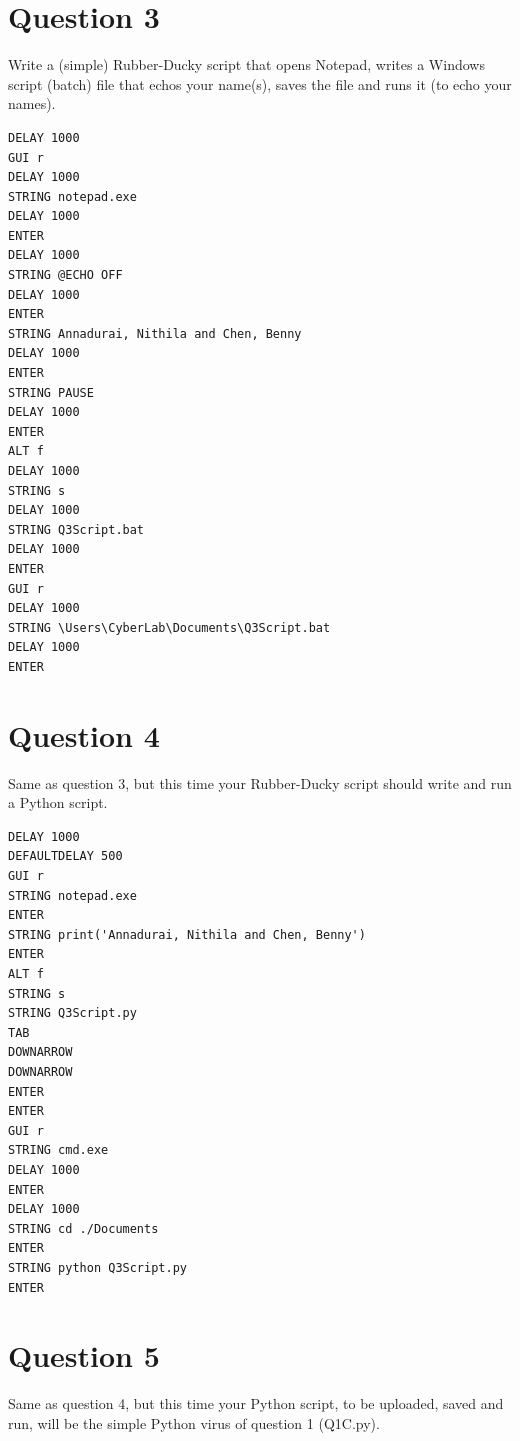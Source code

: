 \documentclass{article}
\begin{document}
\section*{Question 3}
Write a (simple) Rubber-Ducky script that opens Notepad, writes a 
Windows script (batch) file that echos your name(s), saves the file 
and runs it (to echo your names). 

\begin{lstlisting}
DELAY 1000
GUI r
DELAY 1000
STRING notepad.exe
DELAY 1000
ENTER
DELAY 1000
STRING @ECHO OFF
DELAY 1000
ENTER
STRING Annadurai, Nithila and Chen, Benny
DELAY 1000
ENTER
STRING PAUSE
DELAY 1000
ENTER
ALT f
DELAY 1000
STRING s
DELAY 1000
STRING Q3Script.bat
DELAY 1000
ENTER
GUI r
DELAY 1000
STRING \Users\CyberLab\Documents\Q3Script.bat
DELAY 1000
ENTER

\end{lstlisting}

\section*{Question 4}
Same as question 3, but this time your Rubber-Ducky script should 
write and run a Python script. 

\begin{lstlisting}
DELAY 1000
DEFAULTDELAY 500
GUI r
STRING notepad.exe
ENTER
STRING print('Annadurai, Nithila and Chen, Benny')
ENTER
ALT f
STRING s
STRING Q3Script.py
TAB
DOWNARROW
DOWNARROW
ENTER
ENTER
GUI r
STRING cmd.exe
DELAY 1000
ENTER
DELAY 1000
STRING cd ./Documents
ENTER
STRING python Q3Script.py
ENTER

\end{lstlisting}

\section*{Question 5}
Same as question 4, but this time your Python script, to be uploaded, 
saved and run, will be the simple Python virus of question 1 (Q1C.py). 
\end{document}
